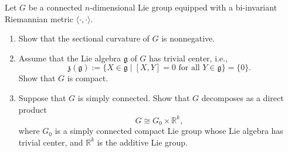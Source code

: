 \begin{exercise}
\label{geometry:2026:3}
Let $G$ be a connected $n$-dimensional Lie group equipped with a bi-invariant
Riemannian metric $\langle\cdot,\cdot\rangle$.
\begin{enumerate}
    \item Show that the sectional curvature of $G$ is nonnegative.
    \item Assume that the Lie algebra $\mathfrak{g}$ of $G$ has trivial center, i.e.,
    \[
        \mathfrak{z}(\mathfrak{g})
        :=\{X\in\mathfrak{g}\mid [X,Y]=0\text{ for all }Y\in\mathfrak{g}\}
        =\{0\}.
    \]
    Show that $G$ is compact.
    \item Suppose that $G$ is simply connected. Show that $G$ decomposes as a direct
    product
    \[
        G\cong G_0\times \mathbb{R}^k,
    \]
    where $G_0$ is a simply connected compact Lie group whose Lie algebra has
    trivial center, and $\mathbb{R}^k$ is the additive Lie group.
\end{enumerate}
\end{exercise}

